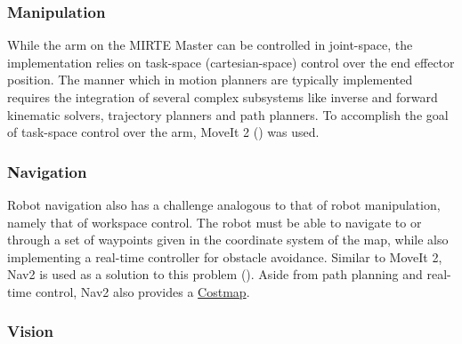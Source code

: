 \subsubsection{Manipulation}

While the arm on the MIRTE Master can be controlled in joint-space, the implementation relies on task-space (cartesian-space) control over the end effector position. \newline
The manner which in motion planners are typically implemented requires the integration of several complex subsystems like inverse and forward kinematic solvers, trajectory planners and path planners. To accomplish the goal of task-space control over the arm, MoveIt 2 (\citet{Coleman2014MoveIt}) was used.

\subsubsection{Navigation}

Robot navigation also has a challenge analogous to that of robot manipulation, namely that of workspace control. The robot must be able to navigate to or through a set of waypoints given in the coordinate system of the map, while also implementing a real-time controller for obstacle avoidance. Similar to MoveIt 2, Nav2 is used as a solution to this problem (\citet{macenski2020marathon2}). Aside from path planning and real-time control, Nav2 also provides a \href{https://docs.nav2.org/configuration/packages/configuring-costmaps.html}{Costmap}.

\subsubsection{Vision}